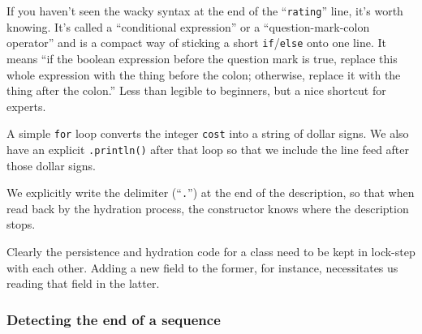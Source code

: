 \begin{compactitem}

\item If you haven't seen the wacky syntax at the end of the
``\texttt{rating}'' line, it's worth knowing. It's called a ``conditional
expression'' or a ``question-mark-colon operator'' and is a compact way of
sticking a short \texttt{if}/\texttt{else} onto one line. It means ``if the
boolean expression before the question mark is true, replace this whole
expression with the thing before the colon; otherwise, replace it with the
thing after the colon.'' Less than legible to beginners, but a nice shortcut
for experts.

\item A simple \texttt{for} loop converts the integer \texttt{cost} into a
string of dollar signs. We also have an explicit \texttt{.println()} after
that loop so that we include the line feed after those dollar signs.

\item We explicitly write the delimiter (``\texttt{.}'') at the end of the
description, so that when read back by the hydration process, the constructor
knows where the description stops.

\end{compactitem}

Clearly the persistence and hydration code for a class need to be kept in
lock-step with each other. Adding a new field to the former, for instance,
necessitates us reading that field in the latter.

\subsubsection{Detecting the end of a sequence}
